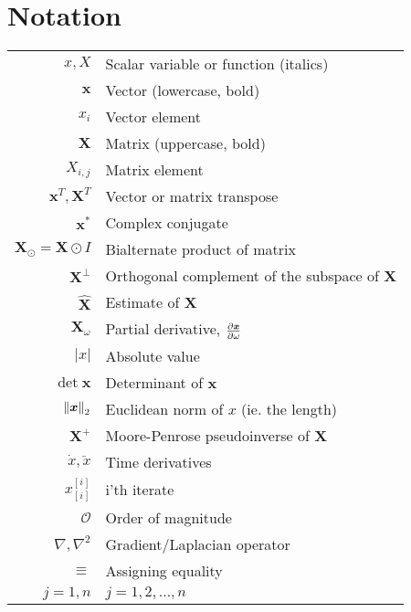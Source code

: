 
\chapter*{Notation}
\label{chap:notation}

\begin{center}
\begin{tabular}{r l}
  \hline
  $x, X$ & Scalar variable or function (italics) \\
  $\bm x$ & Vector (lowercase, bold) \\
  $x_i$ & Vector element \\
  $\bm X$ & Matrix (uppercase, bold) \\
  $X_{i,j}$ & Matrix element \\
  $\bm x^T, \bm X^T$ & Vector or matrix transpose \\
  $\bm x^*$ & Complex conjugate \\
  $\bm X_\odot = \bm X \odot I$ & Bialternate product of matrix \\
  $\bm X^\perp$ & Orthogonal complement of the subspace of $\bm X$ \\
  $\hat {\bm X}$ & Estimate of $\bm X$ \\
  $\bm X_\omega$ & Partial derivative, $\frac{\partial \bm x}{\partial \omega}$ \\
  $|x|$ & Absolute value \\
  $\det \bm x$ & Determinant of $\bm x$ \\
  $\left\lVert \bm x \right\rVert_2$ & Euclidean norm of $x$ (ie. the length) \\
  $\bm X^+$ &  Moore-Penrose pseudoinverse of $\bm X$ \\
  $\dot x, \ddot x$ & Time derivatives \\
  $x^{[i]}_{[i]}$ & i'th iterate \\
  $\mathcal{O}$ & Order of magnitude \\
  $\nabla, \nabla^2$ & Gradient/Laplacian operator \\
  $\equiv$ & Assigning equality \\
  $j=1,n$ & $j=1,2,...,n$ \\
  \hline
\end{tabular}
\end{center}

